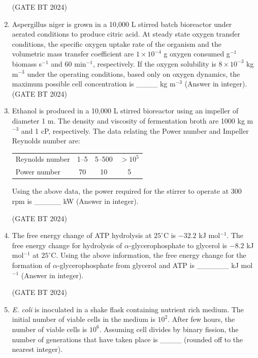 \documentclass[journal,12pt,onecolumn]{IEEEtran}
\theoremstyle{remark}
\begin{document}
\begin{enumerate}
\hfill (GATE BT 2024)

\item
Aspergillus niger is grown in a 10,000 L stirred batch bioreactor under aerated conditions to produce citric acid. At steady state oxygen transfer conditions, the specific oxygen uptake rate of the organism and the volumetric mass transfer coefficient are $1\times10^{-4}$ g oxygen consumed g$^{-1}$ biomass s$^{-1}$ and $60$ min$^{-1}$, respectively. If the oxygen solubility is $8\times10^{-3}$ kg m$^{-3}$ under the operating conditions, based only on oxygen dynamics, the maximum possible cell concentration is \_\_\_\_ kg m$^{-3}$ (Answer in integer).
\hfill (GATE BT 2024)

\item Ethanol is produced in a 10{,}000 L stirred bioreactor using an impeller of diameter 1 m. The density and viscosity of fermentation broth are 1000 kg m$^{-3}$ and 1 cP, respectively. The data relating the Power number and Impeller Reynolds number are:

\begin{center}
\begin{tabular}{lccc}
\hline
Reynolds number & 1--5 & 5--500 & $> 10^5$ \\
Power number & 70 & 10 & 5 \\
\hline
\end{tabular}
\end{center}

Using the above data, the power required for the stirrer to operate at 300 rpm is \_\_\_\_\_ kW (Answer in integer).

\hfill (GATE BT 2024)

\item The free energy change of ATP hydrolysis at $25^\circ$C is $-32.2$ kJ mol$^{-1}$. The free energy change for hydrolysis of $\alpha$-glycerophosphate to glycerol is $-8.2$ kJ mol$^{-1}$ at $25^\circ$C. Using the above information, the free energy change for the formation of $\alpha$-glycerophosphate from glycerol and ATP is \_\_\_\_\_\_ kJ mol$^{-1}$ (Answer in integer).

\hfill (GATE BT 2024)

\item \textit{E. coli} is inoculated in a shake flask containing nutrient rich medium. The initial number of viable cells in the medium is $10^2$. After few hours, the number of viable cells is $10^6$. Assuming cell divides by binary fission, the number of generations that have taken place is \_\_\_\_ (rounded off to the nearest integer).


\end{enumerate}
\end{document}
